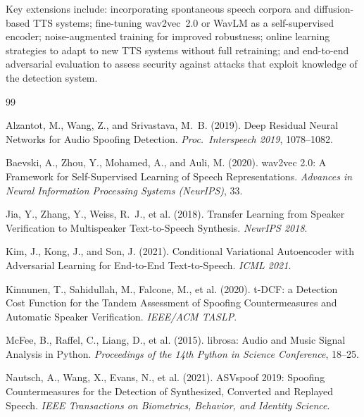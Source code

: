 \documentclass[12pt, a4paper, oneside]{report}
\begin{document}
Key extensions include: incorporating spontaneous speech corpora and diffusion-based TTS systems; fine-tuning wav2vec~2.0 or WavLM as a self-supervised encoder; noise-augmented training for improved robustness; online learning strategies to adapt to new TTS systems without full retraining; and end-to-end adversarial evaluation to assess security against attacks that exploit knowledge of the detection system.



\begin{thebibliography}{99}

Alzantot, M., Wang, Z., and Srivastava, M.~B. (2019).
\newblock Deep Residual Neural Networks for Audio Spoofing Detection.
\newblock \textit{Proc.\ Interspeech 2019}, 1078--1082.

Baevski, A., Zhou, Y., Mohamed, A., and Auli, M. (2020).
\newblock wav2vec 2.0: A Framework for Self-Supervised Learning of Speech Representations.
\newblock \textit{Advances in Neural Information Processing Systems (NeurIPS)}, 33.

Jia, Y., Zhang, Y., Weiss, R.~J., et al. (2018).
\newblock Transfer Learning from Speaker Verification to Multispeaker Text-to-Speech Synthesis.
\newblock \textit{NeurIPS 2018}.

Kim, J., Kong, J., and Son, J. (2021).
\newblock Conditional Variational Autoencoder with Adversarial Learning for End-to-End Text-to-Speech.
\newblock \textit{ICML 2021}.

Kinnunen, T., Sahidullah, M., Falcone, M., et al. (2020).
\newblock t-DCF: a Detection Cost Function for the Tandem Assessment of Spoofing Countermeasures and Automatic Speaker Verification.
\newblock \textit{IEEE/ACM TASLP}.

McFee, B., Raffel, C., Liang, D., et al. (2015).
\newblock librosa: Audio and Music Signal Analysis in Python.
\newblock \textit{Proceedings of the 14th Python in Science Conference}, 18--25.

Nautsch, A., Wang, X., Evans, N., et al. (2021).
\newblock ASVspoof 2019: Spoofing Countermeasures for the Detection of Synthesized, Converted and Replayed Speech.
\newblock \textit{IEEE Transactions on Biometrics, Behavior, and Identity Science}.


\end{thebibliography}
\end{document}
